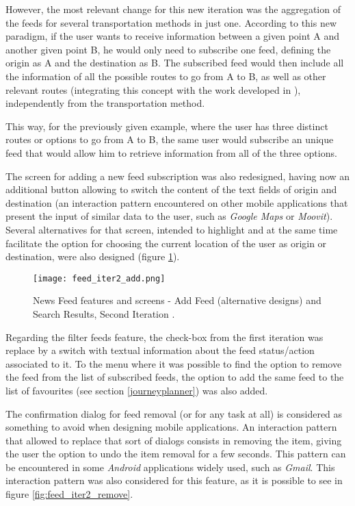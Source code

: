 However, the most relevant change for this new iteration was the aggregation of the feeds for several transportation methods in just one. According to this new paradigm, if the user wants to receive information between a given point A and another given point B, he would only need to subscribe one feed, defining the origin as A and the destination as B. The subscribed feed would then include all the information of all the possible routes to go from A to B, as well as other relevant routes (integrating this concept with the work developed in \cite{kn:Dia13}), independently from the transportation method. 

This way, for the previously given example, where the user has three distinct routes or options to go from A to B, the same user would subscribe an unique feed that would allow him to retrieve information from all of the three options.

The screen for adding a new feed subscription was also redesigned, having now an additional button allowing to switch the content of the text fields of origin and destination (an interaction pattern encountered on other mobile applications that present the input of similar data to the user, such as \emph{Google Maps} or \emph{Moovit}).
Several alternatives for that screen, intended to highlight and at the same time facilitate the option for choosing the current location of the user as origin or destination, were also designed (figure \ref{fig:feed_iter2_add}).

\begin{figure}[!h]
  \begin{center}
    \leavevmode
    \texttt{[image: feed\_iter2\_add.png]}
    \caption{News Feed features and screens - Add Feed (alternative designs) and Search Results, Second Iteration .}
    \label{fig:feed_iter2_add}
  \end{center}
\end{figure}


Regarding the filter feeds feature, the check-box from the first iteration was replace by a switch with textual information about the feed status/action associated to it.
To the menu where it was possible to find the option to remove the feed from the list of subscribed feeds, the option to add the same feed to the list of favourites (see section \ref{journeyplanner}) was also added. 

The confirmation dialog for feed removal (or for any task at all) is considered as something to avoid when designing mobile applications. An interaction pattern that allowed to replace that sort of dialogs consists in removing the item, giving the user the option to undo the item removal for a few seconds. This pattern can be encountered in some \emph{Android} applications widely used, such as \emph{Gmail}. This interaction pattern was also considered for this feature, as it is possible to see in figure \ref{fig:feed_iter2_remove}.

